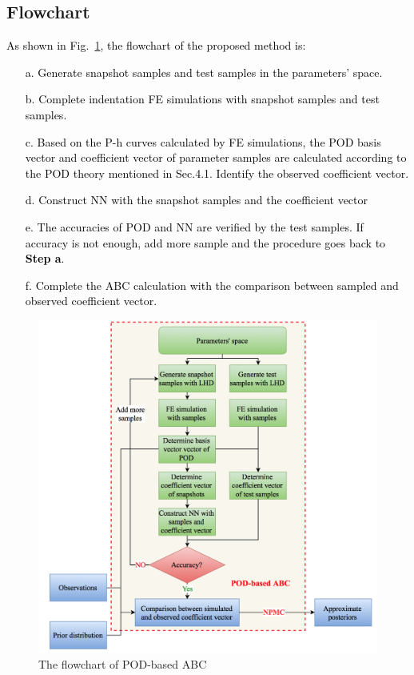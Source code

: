 \documentclass[review]{elsarticle}
\begin{document}
\subsection{Flowchart}
\textcolor{black}{
As shown in Fig.~\ref{fig:flowchart}, the flowchart of the proposed method is:
\begin{itemize}
\item[a.] Generate snapshot samples and test samples in the parameters' space.
\item[b.] Complete indentation FE simulations with  snapshot samples and test samples.
\item[c.] Based on the P-h curves calculated by FE simulations, the POD basis vector and coefficient vector of parameter samples are calculated according to the POD theory mentioned in Sec.4.1. Identify the observed coefficient vector.
\item[d.] Construct NN with the snapshot samples and the coefficient vector
\item[e.] The accuracies of POD and NN are verified by the test samples. If accuracy is not enough, add more sample and the procedure goes back to \textbf{Step a}.
\item[f.] Complete the ABC calculation with the comparison between sampled and observed coefficient vector.
\end{itemize}
}
\begin{figure}[h]
\centering
\includegraphics[width=1\textwidth]{./figs/flowchart.png}
\caption{The flowchart of POD-based ABC}
\label{fig:flowchart}
\end{figure}
\end{document}
